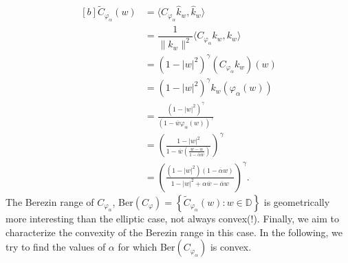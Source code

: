 \documentclass[12pt, reqno]{amsart}
\theoremstyle{definition}
\theoremstyle{remark}
\numberwithin{equation}{section}
\newcommand{\g}{\gamma}
\begin{document}
\begin{equation}\label{eq:berezin_transform}
    \begin{aligned}[b]
        \widetilde{C}_{\varphi_\alpha}(w)&=\langle C_{\varphi_\alpha}\widehat{k}_w,\widehat{k}_w\rangle \\
        &=\dfrac{1}{\|k_w\|^2}\langle C_{\varphi_\alpha}k_w,k_w\rangle \\
        &=\left(1-|w|^2\right)^\g \left(C_{\varphi_\alpha}k_w\right)(w)\\
        &=\left(1-|w|^2\right)^\gamma k_w\left(\varphi_\alpha(w)\right)\\
        &=\frac{\left(1-|w|^2\right)^\gamma}{\left(1-\overline{w}\varphi_\alpha(w)\right)^\gamma}\\
        &=\left(\frac{1-|w|^2}{1-\overline{w}\left(\frac{w-\alpha}{1-\overline{\alpha}w}\right)}\right)^\gamma\\
        &=\left(\frac{\left(1-|w|^2\right)\left(1-\overline{\alpha}w\right)}{1-|w|^2+\alpha\overline{w}-\overline{\alpha}w}\right)^\gamma.
    \end{aligned}
\end{equation}
The Berezin range of $C_{\varphi_\alpha}$, Ber$(C_\varphi)=\left\{\widetilde{C}_{\varphi_\alpha}(w): w\in \mathbb{D}\right\}$ is geometrically more interesting than the elliptic case, not always convex(!).
Finally, we aim to characterize the convexity of the Berezin range in this case. In the following, we try to find the values of $\alpha$ for which Ber$(C_{\varphi_\alpha})$ is convex.\\
\end{document}
